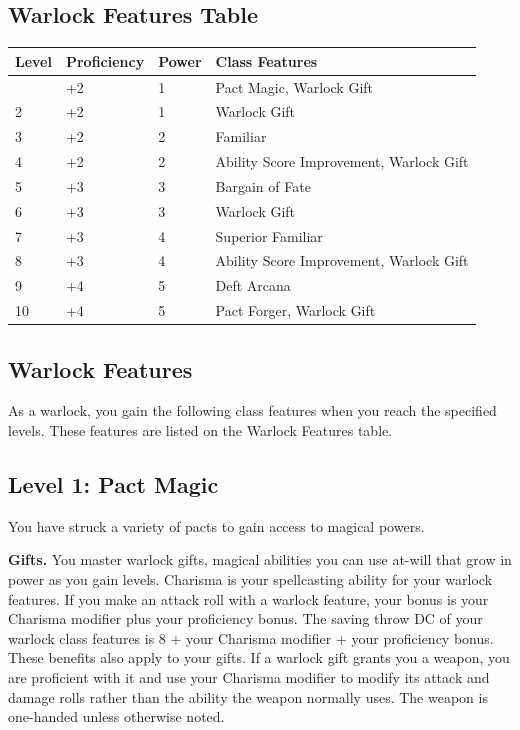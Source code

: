 \documentclass[12pt,letterpaper,twocolumn,openany,nodeprecatedcode,bg=none]{dndbook}
\begin{document}
\subsection{Warlock Features Table}\label{warlock-features-table}

\begin{longtable}[]{@{}llll@{}}
\toprule\noalign{}
Level & Proficiency & Power & Class Features \\
\midrule\noalign{}
\endhead
\bottomrule\noalign{}
\endlastfoot
1 & +2 & 1 & Pact Magic, Warlock Gift \\
2 & +2 & 1 & Warlock Gift \\
3 & +2 & 2 & Familiar \\
4 & +2 & 2 & Ability Score Improvement, Warlock Gift \\
5 & +3 & 3 & Bargain of Fate \\
6 & +3 & 3 & Warlock Gift \\
7 & +3 & 4 & Superior Familiar \\
8 & +3 & 4 & Ability Score Improvement, Warlock Gift \\
9 & +4 & 5 & Deft Arcana \\
10 & +4 & 5 & Pact Forger, Warlock Gift \\
\end{longtable}

\twocolumn

\subsection{Warlock Features}\label{warlock-features}

As a warlock, you gain the following class features when you reach the
specified levels. These features are listed on the Warlock Features
table.

\subsection{Level 1: Pact Magic}\label{level-1-pact-magic}

You have struck a variety of pacts to gain access to magical powers.

\textbf{Gifts.} You master warlock gifts, magical abilities you can use
at-will that grow in power as you gain levels. Charisma is your
spellcasting ability for your warlock features. If you make an attack
roll with a warlock feature, your bonus is your Charisma modifier plus
your proficiency bonus. The saving throw DC of your warlock class
features is 8 + your Charisma modifier + your proficiency bonus. These
benefits also apply to your gifts. If a warlock gift grants you a
weapon, you are proficient with it and use your Charisma modifier to
modify its attack and damage rolls rather than the ability the weapon
normally uses. The weapon is one-handed unless otherwise noted.
\end{document}
